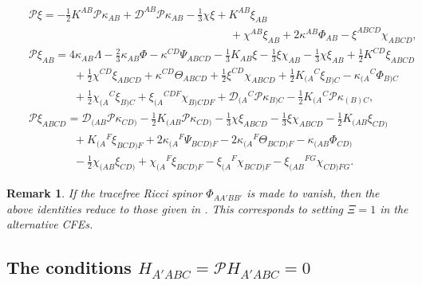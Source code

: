 \documentclass[10pt,a4paper]{article}
\theoremstyle{plain}
\newtheorem{remark}{Remark}
\begin{document}
\begin{subequations}
\begin{eqnarray}
&& \mathcal{P}\xi
  =-\tfrac{1}{2}K^{AB}\mathcal{P}\kappa_{AB}+\mathcal{D}^{AB}\mathcal{P}\kappa_{AB}-
  \tfrac{1}{3} \chi \xi + K^{AB} \xi_{AB} \nonumber\\ && \qquad \qquad
  \qquad \qquad \qquad \qquad \qquad \qquad \qquad + \chi^{AB}
  \xi_{AB} + 2 \kappa^{AB} \Phi_{AB} - \xi^{ABCD}
  \chi_{ABCD},\label{NormalDerivativeXiDerivedFromCommutator1}\\ &&
  \mathcal{P}\xi_{AB} =4 \kappa_{AB} \Lambda - \tfrac{2}{3}
  \kappa_{AB} \Phi - \kappa^{CD} \Psi_{ABCD} - \tfrac{1}{3} K_{AB} \xi
  - \tfrac{1}{3} \xi \chi_{AB} - \tfrac{1}{3} \chi \xi_{AB} +
  \tfrac{1}{2} K^{CD} \xi_{ABCD} \nonumber \\ && \qquad\qquad +
  \tfrac{1}{2} \chi^{CD} \xi_{ABCD} + \kappa^{CD} \Theta_{ABCD} +
  \tfrac{1}{2} \xi^{CD} \chi_{ABCD} + \tfrac{1}{2}
  K_{(A}{}^{C}\xi_{B)C} - \kappa_{(A}{}^{C}\Phi_{B)C} \nonumber
  \\ &&\qquad\qquad + \tfrac{1}{2} \chi_{(A}{}^{C}\xi_{B)C} +
  \xi_{(A}{}^{CDF}\chi_{B)CDF}+
  \mathcal{D}_{(A}{}^C\mathcal{P}\kappa_{B)C}
  -\tfrac{1}{2}K_{(A}{}^C\mathcal{P}\kappa_{(B)C},
\label{NormalDerivativeXiDerivedFromCommutator2}
\\ &&\mathcal{P}\xi_{ABCD}=\mathcal{D}_{(AB}\mathcal{P}\kappa_{CD)}
-\tfrac{1}{2}K_{(AB}\mathcal{P}\kappa_{CD)} - \tfrac{1}{3} \chi
\xi_{ABCD} - \tfrac{1}{3} \xi \chi_{ABCD} - \tfrac{1}{2}
K_{(AB}\xi_{CD)} \nonumber \\ &&\qquad\qquad+ K_{(A}{}^{F}\xi_{BCD)F}
+ 2 \kappa_{(A}{}^{F}\Psi_{BCD)F} - 2 \kappa_{(A}{}^{F}\Theta_{BCD)F}
- \kappa_{(AB}\Phi_{CD)} \nonumber \\ &&\qquad\qquad - \tfrac{1}{2}
\chi_{(AB}\xi_{CD)} + \chi_{(A}{}^{F}\xi_{BCD)F} -
\xi_{(A}{}^{F}\chi_{BCD)F} -
\xi_{(AB}{}^{FG}\chi_{CD)FG}. \label{NormalDerivativeXiDerivedFromCommutator3}
\end{eqnarray}
\end{subequations}

\begin{remark}
\emph{
If the tracefree Ricci spinor $\Phi_{AA'BB'}$ is made to vanish, then the above identities reduce to 
those given in \cite{BaeVal10b}. This corresponds to setting $\Xi= 1$ in the alternative CFEs.}
\end{remark}

\subsection{The conditions $H_{A'ABC}=\mathcal{P} H_{A'ABC}=0$}
\label{TheHandPHCondition}
\end{document}

